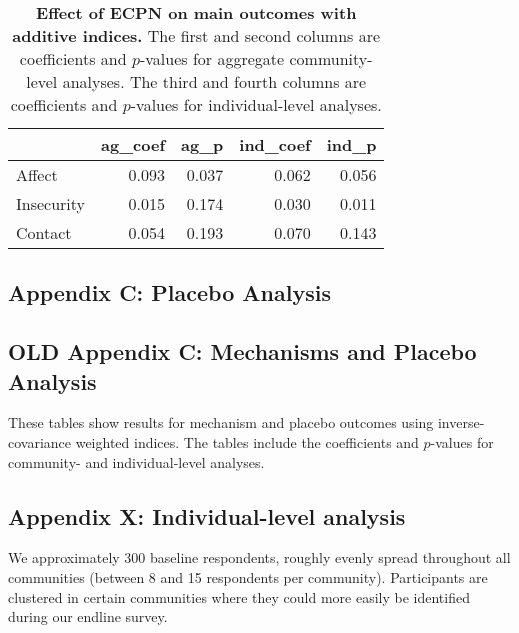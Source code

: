 \documentclass[
]{article}
\begin{document}
\begin{table}[H]
\begin{center}

\begin{tabular}{l|r|r|r|r}
\hline
  & ag\_coef & ag\_p & ind\_coef & ind\_p\\
\hline
Affect & 0.093 & 0.037 & 0.062 & 0.056\\
\hline
Insecurity & 0.015 & 0.174 & 0.030 & 0.011\\
\hline
Contact & 0.054 & 0.193 & 0.070 & 0.143\\
\hline
\end{tabular}


\caption{\label{tab:add_ind_tab}\textbf{Effect of ECPN on main outcomes with additive indices.} The first and second columns are coefficients and $p$-values for aggregate community-level analyses.  The third and fourth columns are coefficients and $p$-values for individual-level analyses.}
\end{center}
\end{table}

\hypertarget{appendix-c-placebo-analysis}{%
\subsection{Appendix C: Placebo
Analysis}\label{appendix-c-placebo-analysis}}

\hypertarget{old-appendix-c-mechanisms-and-placebo-analysis}{%
\subsection{OLD Appendix C: Mechanisms and Placebo
Analysis}\label{old-appendix-c-mechanisms-and-placebo-analysis}}

These tables show results for mechanism and placebo outcomes using
inverse-covariance weighted indices. The tables include the coefficients
and \(p\)-values for community- and individual-level analyses.

\hypertarget{appendix-x-individual-level-analysis}{%
\subsection{Appendix X: Individual-level
analysis}\label{appendix-x-individual-level-analysis}}

We approximately 300 baseline respondents, roughly evenly spread
throughout all communities (between 8 and 15 respondents per community).
Participants are clustered in certain communities where they could more
easily be identified during our endline survey.
\end{document}
